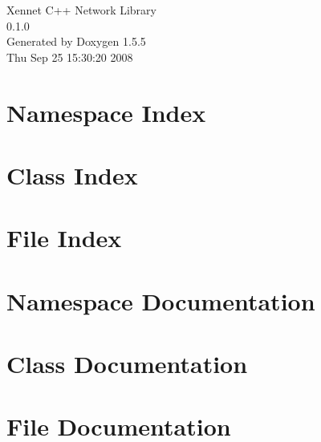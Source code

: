\documentclass[a4paper]{book}
\begin{document}
\begin{titlepage}
\vspace*{7cm}
\begin{center}
{\Large Xennet C++ Network Library \\[1ex]\large 0.1.0 }\\
\vspace*{1cm}
{\large Generated by Doxygen 1.5.5}\\
\vspace*{0.5cm}
{\small Thu Sep 25 15:30:20 2008}\\
\end{center}
\end{titlepage}
\clearemptydoublepage
{}
\tableofcontents
\clearemptydoublepage
{}
\chapter{Namespace Index}

\chapter{Class Index}

\chapter{File Index}

\chapter{Namespace Documentation}

\chapter{Class Documentation}







\chapter{File Documentation}























\printindex
\end{document}
